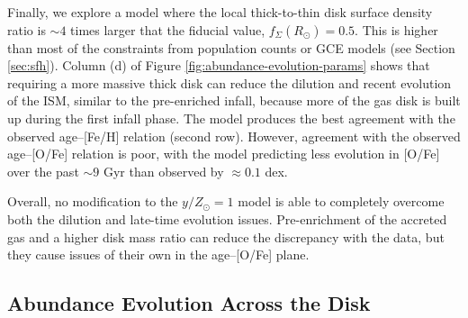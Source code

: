 \documentclass[twocolumn,twocolappendix,linenumbers]{aastex631}
\newcommand{\yZ}[1]{$y/Z_\odot=#1$}
\begin{document}
Finally, we explore a model where the local thick-to-thin disk surface density ratio is $\sim4$ times larger that the fiducial value, $f_\Sigma(R_\odot)=0.5$. This is higher than most of the constraints from population counts or GCE models (see Section \ref{sec:sfh}). Column (d) of Figure \ref{fig:abundance-evolution-params} shows that requiring a more massive thick disk can reduce the dilution and recent evolution of the ISM, similar to the pre-enriched infall, because more of the gas disk is built up during the first infall phase. The model produces the best agreement with the observed age--[Fe/H] relation (second row). However, agreement with the observed age--[O/Fe] relation is poor, with the model predicting less evolution in [O/Fe] over the past $\sim9$ Gyr than observed by $\approx0.1$ dex.

Overall, no modification to the \yZ{1} model is able to completely overcome both the dilution and late-time evolution issues. Pre-enrichment of the accreted gas and a higher disk mass ratio can reduce the discrepancy with the data, but they cause issues of their own in the age--[O/Fe] plane. 

\subsection{Abundance Evolution Across the Disk}
\label{sec:disk-evolution}
\end{document}
